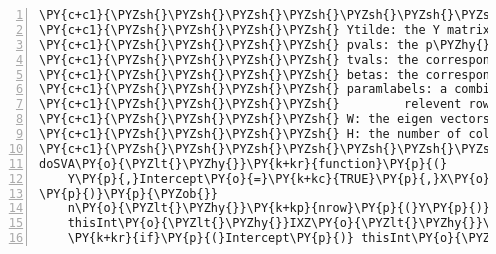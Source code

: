 \begin{Verbatim}[commandchars=\\\{\},codes={\catcode`\$=3\catcode`\^=7\catcode`\_=8},gobble=0,numbers=left,fontfamily=fvm,fontshape=n,fontsize=\footnotesize,tabsize=2]
\PY{c+c1}{\PYZsh{}\PYZsh{}\PYZsh{}\PYZsh{}\PYZsh{}\PYZsh{}\PYZsh{}\PYZsh{}\PYZsh{}\PYZsh{}\PYZsh{}\PYZsh{}\PYZsh{}\PYZsh{}\PYZsh{}\PYZsh{}\PYZsh{}\PYZsh{}\PYZsh{}\PYZsh{}\PYZsh{}\PYZsh{}\PYZsh{}\PYZsh{}\PYZsh{}\PYZsh{}\PYZsh{}\PYZsh{}\PYZsh{}\PYZsh{}\PYZsh{}\PYZsh{}\PYZsh{}\PYZsh{}\PYZsh{}\PYZsh{} OUTPUTS \PYZsh{}\PYZsh{}\PYZsh{}\PYZsh{}\PYZsh{}\PYZsh{}\PYZsh{}\PYZsh{}\PYZsh{}\PYZsh{}\PYZsh{}\PYZsh{}\PYZsh{}\PYZsh{}\PYZsh{}\PYZsh{}\PYZsh{}\PYZsh{}\PYZsh{}\PYZsh{}\PYZsh{}\PYZsh{}\PYZsh{}\PYZsh{}\PYZsh{}\PYZsh{}\PYZsh{}\PYZsh{}\PYZsh{}\PYZsh{}\PYZsh{}\PYZsh{}\PYZsh{}}
\PY{c+c1}{\PYZsh{}\PYZsh{}\PYZsh{}\PYZsh{} Ytilde: the Y matrix with $Z\beta_j + W\delta_j$ removed}
\PY{c+c1}{\PYZsh{}\PYZsh{}\PYZsh{}\PYZsh{} pvals: the p\PYZhy{}values of Ytilde regressed on $\mu_j + X\alpha_j + Z\beta_j + W\delta_j$}
\PY{c+c1}{\PYZsh{}\PYZsh{}\PYZsh{}\PYZsh{} tvals: the corresponding t\PYZhy{}statistics}
\PY{c+c1}{\PYZsh{}\PYZsh{}\PYZsh{}\PYZsh{} betas: the corresponding $\alpha_j,\beta_j,\delta_j$ estimates}
\PY{c+c1}{\PYZsh{}\PYZsh{}\PYZsh{}\PYZsh{} paramlabels: a combination of I (intercept), X, Z, W to signify the }
\PY{c+c1}{\PYZsh{}\PYZsh{}\PYZsh{}\PYZsh{}         relevent rows of p\PYZhy{}vals/tvals/betas}
\PY{c+c1}{\PYZsh{}\PYZsh{}\PYZsh{}\PYZsh{} W: the eigen vectors matrix}
\PY{c+c1}{\PYZsh{}\PYZsh{}\PYZsh{}\PYZsh{} H: the number of columns of W (used eigen\PYZhy{}vectors)}
\PY{c+c1}{\PYZsh{}\PYZsh{}\PYZsh{}\PYZsh{}\PYZsh{}\PYZsh{}\PYZsh{}\PYZsh{}\PYZsh{}\PYZsh{}\PYZsh{}\PYZsh{}\PYZsh{}\PYZsh{}\PYZsh{}\PYZsh{}\PYZsh{}\PYZsh{}\PYZsh{}\PYZsh{}\PYZsh{}\PYZsh{}\PYZsh{}\PYZsh{}\PYZsh{}\PYZsh{}\PYZsh{}\PYZsh{}\PYZsh{}\PYZsh{}\PYZsh{}\PYZsh{}\PYZsh{}\PYZsh{}\PYZsh{}\PYZsh{}\PYZsh{}\PYZsh{}\PYZsh{}\PYZsh{}\PYZsh{}\PYZsh{}\PYZsh{}\PYZsh{}\PYZsh{}\PYZsh{}\PYZsh{}\PYZsh{}\PYZsh{}\PYZsh{}\PYZsh{}\PYZsh{}\PYZsh{}\PYZsh{}\PYZsh{}\PYZsh{}\PYZsh{}\PYZsh{}\PYZsh{}\PYZsh{}\PYZsh{}\PYZsh{}\PYZsh{}\PYZsh{}\PYZsh{}\PYZsh{}\PYZsh{}\PYZsh{}\PYZsh{}\PYZsh{}\PYZsh{}\PYZsh{}\PYZsh{}\PYZsh{}\PYZsh{}\PYZsh{}\PYZsh{}\PYZsh{}\PYZsh{}}
doSVA\PY{o}{\PYZlt{}\PYZhy{}}\PY{k+kr}{function}\PY{p}{(}
	Y\PY{p}{,}Intercept\PY{o}{=}\PY{k+kc}{TRUE}\PY{p}{,}X\PY{o}{=}\PY{k+kc}{NULL}\PY{p}{,}Z\PY{o}{=}\PY{k+kc}{NULL}\PY{p}{,}nosigsv\PY{o}{=}\PY{k+kc}{NULL}\PY{p}{,}verbose\PY{o}{=}\PY{k+kc}{FALSE}\PY{p}{,}seed\PY{o}{=}\PY{k+kc}{NULL}
\PY{p}{)}\PY{p}{\PYZob{}}
	n\PY{o}{\PYZlt{}\PYZhy{}}\PY{k+kp}{nrow}\PY{p}{(}Y\PY{p}{)}
	thisInt\PY{o}{\PYZlt{}\PYZhy{}}IXZ\PY{o}{\PYZlt{}\PYZhy{}}\PY{k+kc}{NULL}
	\PY{k+kr}{if}\PY{p}{(}Intercept\PY{p}{)} thisInt\PY{o}{\PYZlt{}\PYZhy{}}\PY{k+kt}{matrix}\PY{p}{(}\PY{l+m}{1}\PY{p}{,}nrow\PY{o}{=}n\PY{p}{,}ncol\PY{o}{=}\PY{l+m}{1}\PY{p}{,}dimnames\PY{o}{=}\PY{k+kt}{list}\PY{p}{(}\PY{k+kc}{NULL}\PY{p}{,}\PY{l+s}{\PYZdq{}}\PY{l+s}{Intcpt\PYZdq{}}\PY{p}{)}\PY{p}{)}

\end{Verbatim}
